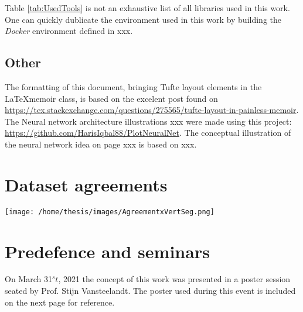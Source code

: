Table \ref{tab:UsedTools} is not an exhaustive list of all libraries used in this work.
One can quickly dublicate the environment used in this work by building the \textit{Docker} environment defined in xxx.


\section{Other}
The formatting of this document, bringing Tufte layout elements in the \LaTeX memoir class, is based on the excelent post found on \url{https://tex.stackexchange.com/questions/275565/tufte-layout-in-painless-memoir}.
The Neural network architecture illustrations xxx were made using this project: \url{https://github.com/HarisIqbal88/PlotNeuralNet}.
The conceptual illustration of the neural network idea on page xxx is based on xxx.



\chapter{Dataset agreements\label{seg:datasetagreement}}

\texttt{[image: /home/thesis/images/AgreementxVertSeg.png]}

\chapter{Predefence and seminars}
\par{
  On March 31$^st$, 2021 the concept of this work was presented in a poster session seated by Prof. Stijn Vansteelandt.
The poster used during this event is included on the next page for reference.
}





